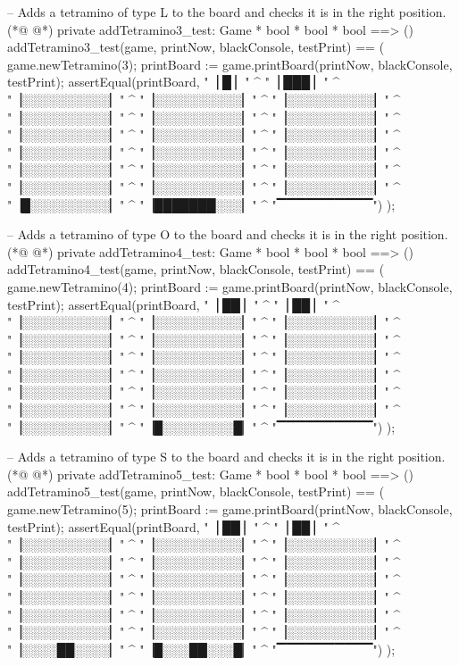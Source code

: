 \begin{vdmpp}[breaklines=true]
  -- Adds a tetramino of type L to the board and checks it is in the right position.
(*@
\label{addTetramino3:test:103}
@*)
  private addTetramino3_test: Game * bool * bool * bool ==> ()
  addTetramino3_test(game, printNow, blackConsole, testPrint) == (  
   game.newTetramino(3);
   printBoard := game.printBoard(printNow, blackConsole, testPrint);
   assertEqual(printBoard, 
    "\n▕     █    ▏" ^
    "\n▕   ███    ▏" ^
    "\n▕░░░░░░░░░░▏" ^
    "\n▕░░░░░░░░░░▏" ^
    "\n▕░░░░░░░░░░▏" ^
    "\n▕░░░░░░░░░░▏" ^
    "\n▕░░░░░░░░░░▏" ^
    "\n▕░░░░░░░░░░▏" ^
    "\n▕░░░░░░░░░░▏" ^
    "\n▕░░░░░░░░░░▏" ^
    "\n▕░░░░░░░░░░▏" ^
    "\n▕░░░░░░░░░░▏" ^
    "\n▕░░░░░░░░░░▏" ^
    "\n▕░░░░░░░░░░▏" ^
    "\n▕░░░░░░░░░░▏" ^
    "\n▕░░░░░░░░░░▏" ^
    "\n▕░░░░░░░░░░▏" ^
    "\n▕░░░░░░░░░░▏" ^
    "\n▕░░░░░░░░░░▏" ^
    "\n▕░░░░░░░░░░▏" ^
    "\n▕█░░░░░░░░░▏" ^
    "\n▕███████░░░▏" ^
    "\n ▔▔▔▔▔▔▔▔▔▔")
  );

  -- Adds a tetramino of type O to the board and checks it is in the right position.
(*@
\label{addTetramino4:test:134}
@*)
  private addTetramino4_test: Game * bool * bool * bool ==> ()
  addTetramino4_test(game, printNow, blackConsole, testPrint) == (  
   game.newTetramino(4);
   printBoard := game.printBoard(printNow, blackConsole, testPrint);
   assertEqual(printBoard, 
    "\n▕    ██    ▏" ^
    "\n▕    ██    ▏" ^
    "\n▕░░░░░░░░░░▏" ^
    "\n▕░░░░░░░░░░▏" ^
    "\n▕░░░░░░░░░░▏" ^
    "\n▕░░░░░░░░░░▏" ^
    "\n▕░░░░░░░░░░▏" ^
    "\n▕░░░░░░░░░░▏" ^
    "\n▕░░░░░░░░░░▏" ^
    "\n▕░░░░░░░░░░▏" ^
    "\n▕░░░░░░░░░░▏" ^
    "\n▕░░░░░░░░░░▏" ^
    "\n▕░░░░░░░░░░▏" ^
    "\n▕░░░░░░░░░░▏" ^
    "\n▕░░░░░░░░░░▏" ^
    "\n▕░░░░░░░░░░▏" ^
    "\n▕░░░░░░░░░░▏" ^
    "\n▕░░░░░░░░░░▏" ^
    "\n▕░░░░░░░░░░▏" ^
    "\n▕░░░░░░░░░░▏" ^
    "\n▕░░░░░░░░░░▏" ^
    "\n▕█░░░░░░░░█▏" ^
    "\n ▔▔▔▔▔▔▔▔▔▔")
  );

  -- Adds a tetramino of type S to the board and checks it is in the right position.
(*@
\label{addTetramino5:test:165}
@*)
  private addTetramino5_test: Game * bool * bool * bool ==> ()
  addTetramino5_test(game, printNow, blackConsole, testPrint) == (  
   game.newTetramino(5);
   printBoard := game.printBoard(printNow, blackConsole, testPrint);
   assertEqual(printBoard, 
    "\n▕    ██    ▏" ^
    "\n▕   ██     ▏" ^
    "\n▕░░░░░░░░░░▏" ^
    "\n▕░░░░░░░░░░▏" ^
    "\n▕░░░░░░░░░░▏" ^
    "\n▕░░░░░░░░░░▏" ^
    "\n▕░░░░░░░░░░▏" ^
    "\n▕░░░░░░░░░░▏" ^
    "\n▕░░░░░░░░░░▏" ^
    "\n▕░░░░░░░░░░▏" ^
    "\n▕░░░░░░░░░░▏" ^
    "\n▕░░░░░░░░░░▏" ^
    "\n▕░░░░░░░░░░▏" ^
    "\n▕░░░░░░░░░░▏" ^
    "\n▕░░░░░░░░░░▏" ^
    "\n▕░░░░░░░░░░▏" ^
    "\n▕░░░░░░░░░░▏" ^
    "\n▕░░░░░░░░░░▏" ^
    "\n▕░░░░░░░░░░▏" ^
    "\n▕░░░░░░░░░░▏" ^
    "\n▕░░░░██░░░░▏" ^
    "\n▕█░░░██░░░█▏" ^
    "\n ▔▔▔▔▔▔▔▔▔▔")
  );


\end{vdmpp}
